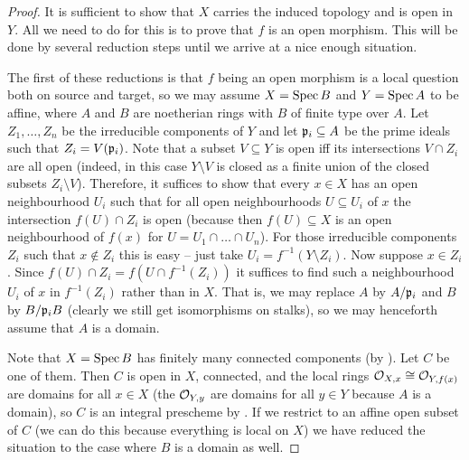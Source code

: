 \documentclass[a4paper,parskip=half,numbers=enddot, DIV=12]{scrreprt}
\begin{document}
\begin{proof}
	It is sufficient to show that $X$ carries the induced topology and is open in $Y$. All we need to do for this is to prove that $f$ is an open morphism. This will be done by several reduction steps until we arrive at a nice enough situation.
	
	The first of these reductions is that $f$ being an open morphism is a local question both on source and target, so we may assume $X=\operatorname{Spec} B$ and $Y=\operatorname{Spec} A$ to be affine, where $A$ and $B$ are noetherian rings with $B$ of finite type over $A$. Let $Z_1,\ldots,Z_n$ be the irreducible components of $Y$ and let $\mathfrak{p}_i\subseteq A$ be the prime ideals such that $Z_i=V(\mathfrak{p}_i)$. Note that a subset $V\subseteq Y$ is open iff its intersections $V\cap Z_i$ are all open (indeed, in this case $Y\setminus V$ is closed as a finite union of the closed subsets $Z_i\setminus V$). Therefore, it suffices to show that every $x\in X$ has an open neighbourhood $U_i$ such that for all open neighbourhoods $U\subseteq U_i$ of $x$ the intersection $f(U)\cap Z_i$ is open (because then $f(U)\subseteq X$ is an open neighbourhood of $f(x)$ for $U=U_1\cap \ldots\cap U_n$). For those irreducible components $Z_i$ such that $x\notin Z_i$ this is easy -- just take $U_i=f^{-1}(Y\setminus Z_i)$. Now suppose $x\in Z_i$. Since $f(U)\cap Z_i=f\left(U\cap f^{-1}(Z_i)\right)$ it suffices to find such a neighbourhood $U_i$ of $x$ in $f^{-1}(Z_i)$ rather than in $X$. That is, we may replace $A$ by $A/\mathfrak{p}_i$ and $B$ by $B/\mathfrak{p}_i B$ (clearly we still get isomorphisms on stalks), so we may henceforth assume that $A$ is a domain.
	
	Note that $X=\operatorname{Spec} B$ has finitely many connected components (by \cite[Lemma~2.4.2]{alggeo1}). Let $C$ be one of them. Then $C$ is open in $X$, connected, and the local rings $\mathcal{O}_{X,x}\cong \mathcal{O}_{Y,f(x)}$ are domains for all $x\in X$ (the $\mathcal{O}_{Y,y}$ are domains for all $y\in Y$ because $A$ is a domain), so $C$ is an integral prescheme by \cite[Proposition~2.1.4]{alggeo1}. If we restrict to an affine open subset of $C$ (we can do this because everything is local on $X$) we have reduced the situation to the case where $B$ is a domain as well.
	

\end{proof}
\end{document}
